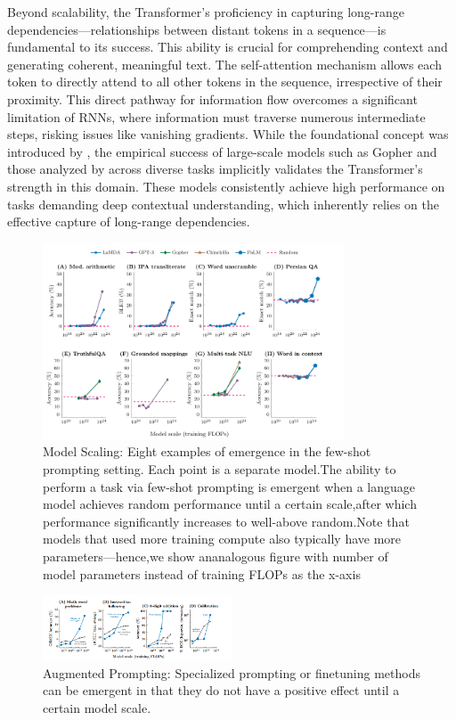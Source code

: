 Beyond scalability, the Transformer's proficiency in capturing long-range dependencies—relationships between distant tokens in a sequence—is fundamental to its success. This ability is crucial for comprehending context and generating coherent, meaningful text. The self-attention mechanism allows each token to directly attend to all other tokens in the sequence, irrespective of their proximity. This direct pathway for information flow overcomes a significant limitation of RNNs, where information must traverse numerous intermediate steps, risking issues like vanishing gradients. While the foundational concept was introduced by \parencite{vaswani_attention_2023}, the empirical success of large-scale models such as Gopher and those analyzed by \parencite{kaplan_scaling_2020} across diverse tasks implicitly validates the Transformer's strength in this domain. These models consistently achieve high performance on tasks demanding deep contextual understanding, which inherently relies on the effective capture of long-range dependencies.

\begin{figure}[htpb]
    \centering
    \includegraphics[width=0.8\textwidth]{../images/image.png} %
    \caption{Model Scaling: Eight examples of emergence in the few-shot prompting setting. Each point is a separate model.The ability to perform a task via few-shot prompting is emergent when a language model achieves random performance until a certain scale,after which performance significantly increases to well-above random.Note that models that used more training compute also typically have more parameters—hence,we show ananalogous figure with number of model parameters instead of training FLOPs as the x-axis}
    \label{fig:model_scaling}
\end{figure}

\begin{figure}[htpb]
    \centering
    \includegraphics[width=0.5\textwidth]{../images/image-1.png} %
    \caption{Augmented Prompting: Specialized prompting or finetuning methods can be emergent in that they do not have a positive
 effect until a certain model scale.}
    \label{fig:augmendted_prompting}
\end{figure}


